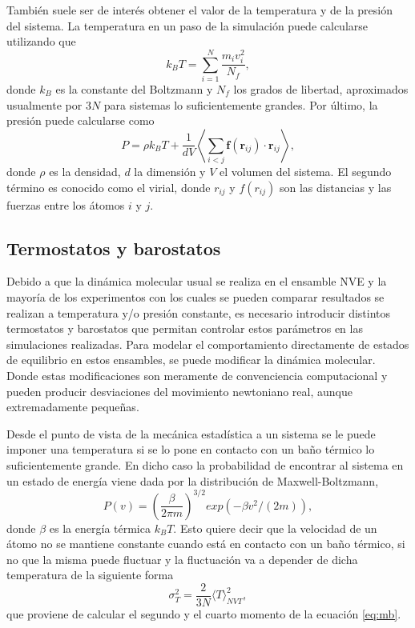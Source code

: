 También suele ser de interés obtener el valor de la temperatura y de la presión
del sistema. La temperatura en un paso de la simulación puede calcularse 
utilizando que
\begin{equation}\label{eq:tempvel}
    k_B T = \sum_{i=1}^N \frac{m_i v_i^2}{N_f},
\end{equation}
donde $k_B$ es la constante del Boltzmann y $N_f$ los grados de libertad,
aproximados usualmente por $3N$ para sistemas lo suficientemente grandes. Por 
último, la presión puede calcularse como 
$$
P = \rho k_B T + \frac{1}{d V} \left\langle \sum_{i<j} \mathbf{f}(\mathbf{r}_{ij}) \cdot \mathbf{r}_{ij} \right\rangle,
$$
donde $\rho$ es la densidad, $d$ la dimensión y $V$ el volumen del sistema. El
segundo término es conocido como el virial, donde $r_{ij}$ y $f(r_{ij})$ son las 
distancias y las fuerzas entre los átomos $i$ y $j$.

\subsection{Termostatos y barostatos}

Debido a que la dinámica molecular usual se realiza en el ensamble NVE y la 
mayoría de los experimentos con los cuales se pueden comparar resultados se 
realizan a temperatura y/o presión constante, es necesario introducir distintos
termostatos y barostatos que permitan controlar estos parámetros en las 
simulaciones realizadas. Para modelar el comportamiento directamente de estados
de equilibrio en estos ensambles, se puede modificar la dinámica molecular. Donde
estas modificaciones son meramente de convenciencia computacional y pueden producir 
desviaciones del movimiento newtoniano real, aunque extremadamente pequeñas.

Desde el punto de vista de la mecánica estadística a un sistema se le puede 
imponer una temperatura si se lo pone en contacto con un baño térmico lo 
suficientemente grande. En dicho caso la probabilidad de encontrar al sistema en
un estado de energía viene dada por la distribución de Maxwell-Boltzmann,
\begin{equation}\label{eq:mb}
P(v) = \left( \frac{\beta}{2\pi m} \right)^{3/2} exp(-\beta v^2 / (2m)),
\end{equation}
donde $\beta$ es la energía térmica $k_BT$. Esto quiere decir que la velocidad de
un átomo no se mantiene constante cuando está en contacto con un baño térmico, si 
no que la misma puede fluctuar y la fluctuación va a depender de dicha temperatura
de la siguiente forma
$$
\sigma_T^2 = \frac{2}{3 N} \langle T \rangle_{NVT}^2,
$$
que proviene de calcular el segundo y el cuarto momento de la ecuación \ref{eq:mb}.

